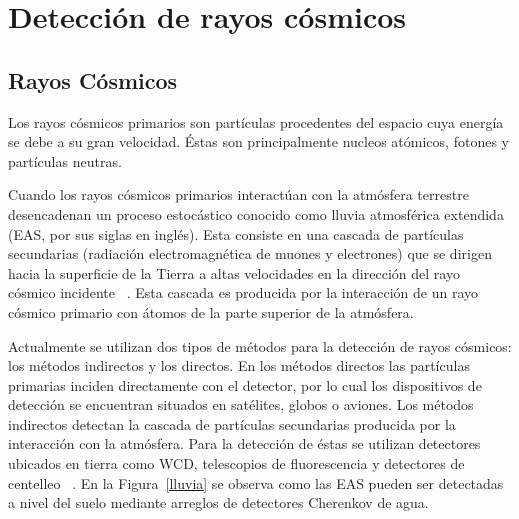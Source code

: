 \chapter{Detección de rayos cósmicos}

\section{Rayos Cósmicos}
Los rayos cósmicos primarios son partículas procedentes del espacio cuya energía se debe a su gran velocidad.
Éstas son principalmente nucleos atómicos, fotones y partículas neutras.

Cuando los rayos cósmicos primarios interactúan con la atmósfera terrestre desencadenan un proceso estocástico conocido como lluvia atmosférica extendida (EAS, por sus siglas en inglés).
Esta consiste en una cascada de partículas secundarias (radiación electromagnética de muones y electrones) que se dirigen hacia la superficie de la Tierra a altas velocidades en la dirección del rayo cósmico incidente ~\citep{ASOREY2012}.
Esta cascada es producida por la interacción de un rayo cósmico primario con átomos de la parte superior de la atmósfera.


Actualmente se utilizan dos tipos de métodos para la detección de rayos cósmicos: los métodos indirectos y los directos.
En los métodos directos las partículas primarias inciden directamente con el detector, por lo cual los dispositivos de detección se encuentran situados en satélites, globos o aviones.
Los métodos indirectos detectan la cascada de partículas secundarias producida por la interacción con la atmósfera.
Para la detección de éstas se  utilizan detectores ubicados en tierra como WCD, telescopios de fluorescencia y detectores de centelleo ~\citep{schlaepfer2003cosmic}.
En la Figura~\ref{lluvia} se observa como las EAS pueden ser detectadas a nivel del suelo mediante arreglos de detectores Cherenkov de agua.

